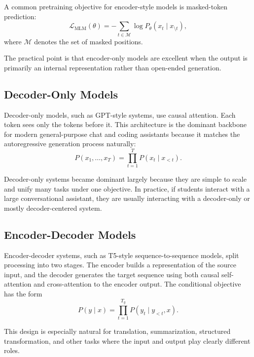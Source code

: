\documentclass[12pt]{article}
\begin{document}
A common pretraining objective for encoder-style models is masked-token prediction:
\begin{equation}
    \mathcal{L}_{\mathrm{MLM}}(\theta)
    = -\sum_{t\in \mathcal{M}} \log P_\theta(x_t \mid x_{\setminus t}),
    \label{t16eq:mlm}
\end{equation}
where $\mathcal{M}$ denotes the set of masked positions.

The practical point is that encoder-only models are excellent when the output is primarily an internal representation rather than open-ended generation.

\subsection{Decoder-Only Models}

Decoder-only models, such as GPT-style systems, use causal attention. Each token sees only the tokens before it. This architecture is the dominant backbone for modern general-purpose chat and coding assistants because it matches the autoregressive generation process naturally:
\begin{equation}
    P(x_1,\dots,x_T) = \prod_{t=1}^T P(x_t\mid x_{<t}).
    \label{t16eq:autoregressive}
\end{equation}

Decoder-only systems became dominant largely because they are simple to scale and unify many tasks under one objective. In practice, if students interact with a large conversational assistant, they are usually interacting with a decoder-only or mostly decoder-centered system.

\subsection{Encoder-Decoder Models}

Encoder-decoder systems, such as T5-style sequence-to-sequence models, split processing into two stages. The encoder builds a representation of the source input, and the decoder generates the target sequence using both causal self-attention and cross-attention to the encoder output. The conditional objective has the form
\begin{equation}
    P(y\mid x) = \prod_{t=1}^{T_y} P(y_t \mid y_{<t}, x).
    \label{t16eq:seq2seq}
\end{equation}

This design is especially natural for translation, summarization, structured transformation, and other tasks where the input and output play clearly different roles.
\end{document}
